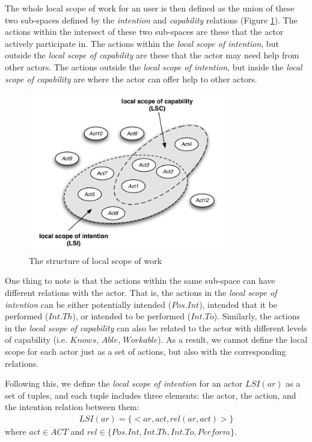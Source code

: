 The whole local scope of work for an user is then defined as the union of these two sub-spaces defined by the \emph{intention} and \emph{capability} relations (Figure \ref{fig:local_scope}). The actions within the intersect of these two sub-spaces are these that the actor actively participate in. The actions within the \emph{local scope of intention}, but outside the \emph{local scope of capability} are these that the actor may need help from other actors. The actions outside the \emph{local scope of intention}, but inside the \emph{local scope of capability} are where the actor can offer help to other actors.

\begin{figure}[htbp] %
   \centering
   \includegraphics[width=3.5in]{local_scope.pdf} 
   \caption{The structure of local scope of work}
   \label{fig:local_scope}
\end{figure}

One thing to note is that the actions within the same sub-space can have different relations with the actor. That is, the actions in the \emph{local scope of intention} can be either potentially intended ($Pos.Int$), intended that it be performed ($Int.Th$), or intended to be performed ($Int.To$). Similarly, the actions in the \emph{local scope of capability} can also be related to the actor with different levels of capability (i.e. $Knows$, $Able$, $Workable$). As a result, we cannot define the local scope for each actor just as a set of actions, but also with the corresponding relations.

Following this, we define the \emph{local scope of intention} for an actor $LSI(ar)$ as a set of tuples, and each tuple includes three elements: the actor, the action, and the intention relation between them:
\begin{align*} 
	LSI(ar) = \{<ar, act, rel(ar, act)>\}
\end{align*}
where $act\in ACT$ and $rel\in \{Pos.Int, Int.Th, Int.To, Perform\}$.

